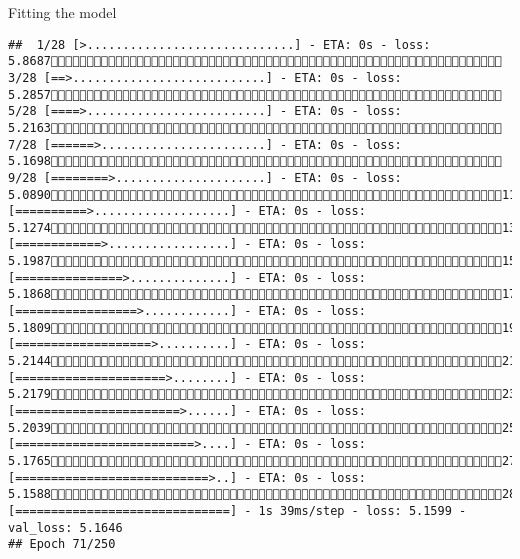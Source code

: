 \documentclass[
  ignorenonframetext,
]{beamer}
\begin{document}
\begin{frame}[fragile]{Fitting the model}
\begin{verbatim}
##  1/28 [>.............................] - ETA: 0s - loss: 5.8687 3/28 [==>...........................] - ETA: 0s - loss: 5.2857 5/28 [====>.........................] - ETA: 0s - loss: 5.2163 7/28 [======>.......................] - ETA: 0s - loss: 5.1698 9/28 [========>.....................] - ETA: 0s - loss: 5.089011/28 [==========>...................] - ETA: 0s - loss: 5.127413/28 [============>.................] - ETA: 0s - loss: 5.198715/28 [===============>..............] - ETA: 0s - loss: 5.186817/28 [=================>............] - ETA: 0s - loss: 5.180919/28 [===================>..........] - ETA: 0s - loss: 5.214421/28 [=====================>........] - ETA: 0s - loss: 5.217923/28 [=======================>......] - ETA: 0s - loss: 5.203925/28 [=========================>....] - ETA: 0s - loss: 5.176527/28 [===========================>..] - ETA: 0s - loss: 5.158828/28 [==============================] - 1s 39ms/step - loss: 5.1599 - val_loss: 5.1646
## Epoch 71/250

\end{verbatim}
\end{frame}
\end{document}
